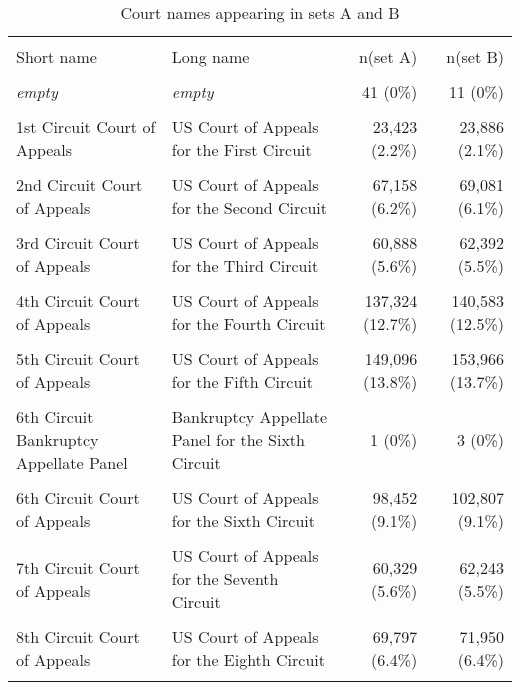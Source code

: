 \documentclass[10pt, letterpaper]{article}
\begin{document}
\begin{spacing}{1.0}
\begin{table}[H]
    \centering
    \caption{Court names appearing in sets A and B}
    \footnotesize
    \begin{tabular}{p{1.75in}p{2.25in}rr}
        \hline\\[-6pt]
        Short name & Long name & n(set A) & n(set B)\\[4pt]
        \hline\\[-6pt]
        \textit{empty} & \textit{empty} & 41 (0\%) & 11 (0\%)\\
        & & &\\[-6pt]
        1st Circuit Court of Appeals & US Court of Appeals for the First Circuit & 23,423 (2.2\%) & 23,886 (2.1\%)\\
        & & &\\[-6pt]
        2nd Circuit Court of Appeals & US Court of Appeals for the Second Circuit & 67,158 (6.2\%) & 69,081 (6.1\%)\\
        & & &\\[-6pt]
        3rd Circuit Court of Appeals & US Court of Appeals for the Third Circuit & 60,888 (5.6\%) & 62,392 (5.5\%)\\
        & & &\\[-6pt]
        4th Circuit Court of Appeals & US Court of Appeals for the Fourth Circuit & 137,324 (12.7\%) & 140,583 (12.5\%)\\
        & & &\\[-6pt]
        5th Circuit Court of Appeals & US Court of Appeals for the Fifth Circuit & 149,096 (13.8\%) & 153,966 (13.7\%)\\
        & & &\\[-6pt]
        6th Circuit Bankruptcy Appellate Panel & Bankruptcy Appellate Panel for the Sixth Circuit & 1 (0\%) & 3 (0\%)\\
        & & &\\[-6pt]
        6th Circuit Court of Appeals & US Court of Appeals for the Sixth Circuit & 98,452 (9.1\%) & 102,807 (9.1\%)\\
        & & &\\[-6pt]
        7th Circuit Court of Appeals & US Court of Appeals for the Seventh Circuit & 60,329 (5.6\%) & 62,243 (5.5\%)\\
        & & &\\[-6pt]
        8th Circuit Court of Appeals & US Court of Appeals for the Eighth Circuit & 69,797 (6.4\%) & 71,950 (6.4\%)\\
        & & &\\[-6pt]

\end{tabular}
\end{table}
\end{spacing}
\end{document}
